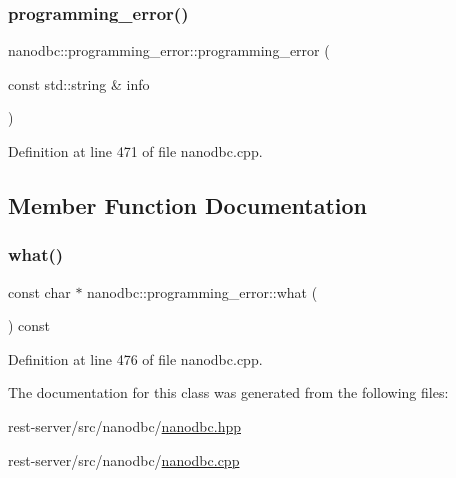 \subsubsection{\texorpdfstring{programming\_error()}{programming\_error()}}
{\footnotesize\ttfamily nanodbc\+::programming\+\_\+error\+::programming\+\_\+error (\begin{DoxyParamCaption}\item[{const std\+::string \&}]{info }\end{DoxyParamCaption})\hspace{0.3cm}{\ttfamily [explicit]}}



Definition at line 471 of file nanodbc.\+cpp.



\subsection{Member Function Documentation}
\mbox{\label{classnanodbc_1_1programming__error_a325389a1a3889694e252e8c87b7f3cec}} 
\subsubsection{\texorpdfstring{what()}{what()}}
{\footnotesize\ttfamily const char $\ast$ nanodbc\+::programming\+\_\+error\+::what (\begin{DoxyParamCaption}{ }\end{DoxyParamCaption}) const\hspace{0.3cm}{\ttfamily [noexcept]}}



Definition at line 476 of file nanodbc.\+cpp.



The documentation for this class was generated from the following files\+:\begin{DoxyCompactItemize}
\item 
rest-\/server/src/nanodbc/\mbox{\hyperlink{nanodbc_8hpp}{nanodbc.\+hpp}}\item 
rest-\/server/src/nanodbc/\mbox{\hyperlink{nanodbc_8cpp}{nanodbc.\+cpp}}\end{DoxyCompactItemize}
